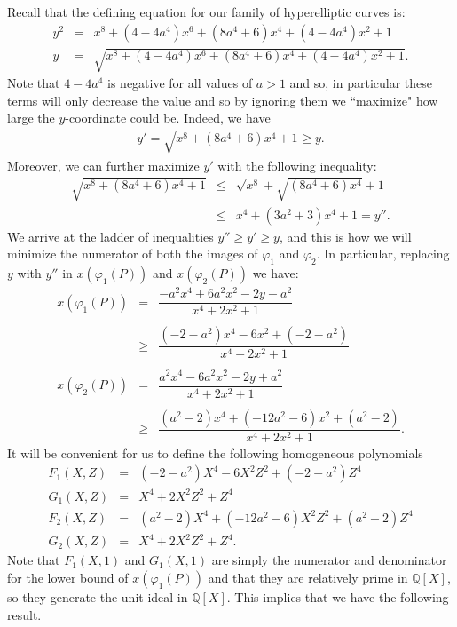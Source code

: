 \documentclass{article}
\newcommand{\Q}{\mathbb{Q}}
\theoremstyle{definition}
\begin{document}
\noindent Recall that the defining equation for our family of hyperelliptic curves is:
\begin{eqnarray*}
    y^2 &=& x^8 + (4-4a^4) x^6 + (8a^4 + 6) x^4 + (4-4a^4) x^2 + 1 \\
    y &=& \sqrt{x^8 + (4-4a^4) x^6 + (8a^4 + 6) x^4 + (4-4a^4) x^2 + 1}.
\end{eqnarray*}
Note that $4-4a^4$ is negative for all values of $a > 1$ and so, in particular these terms will only decrease the value and so by ignoring them we ``maximize" how large the $y$-coordinate could be. Indeed, we have 
\begin{eqnarray*}
    y' = \sqrt{x^8 + (8a^4 + 6) x^4 + 1} \geq y.
\end{eqnarray*}
Moreover, we can further maximize $y'$ with the following inequality:
\begin{eqnarray*}
    \sqrt{x^8 + (8a^4 + 6) x^4 + 1} &\leq& \sqrt{x^8} + \sqrt{(8a^4 + 6)x^4} + 1 \\
    &\leq& x^4 + (3a^2 + 3)x^4 + 1 = y''.
\end{eqnarray*}
We arrive at the ladder of inequalities $y'' \geq y' \geq y$, and this is how we will minimize the numerator of both the images of $\varphi_1$ and $\varphi_2$. In particular, replacing $y$ with $y''$ in $x(\varphi_1(P))$ and $x(\varphi_2(P))$ we have:
\begin{eqnarray*}
    x(\varphi_1(P)) &=& \dfrac{-a^2 x^4 + 6a^2 x^2 - 2y - a^2}{x^4 + 2x^2 + 1} \\\\
    &\geq& \dfrac{(-2-a^2)x^4 - 6x^2 + (-2-a^2)}{x^4 + 2x^2 + 1} \\\\
    x(\varphi_2(P)) &=& \dfrac{a^2 x^4 - 6a^2 x^2 - 2y + a^2}{x^4 + 2x^2 + 1} \\\\
    &\geq& \dfrac{(a^2-2)x^4 + (-12a^2 -6)x^2 + (a^2 - 2)}{x^4 + 2x^2 + 1}.
\end{eqnarray*}
It will be convenient for us to define the following homogeneous polynomials
\begin{eqnarray*}
    F_1(X,Z) &=& (-2-a^2)X^4 - 6X^2Z^2 + (-2-a^2)Z^4 \\
    G_1(X,Z) &=& X^4 + 2X^2Z^2 + Z^4 \\
    F_2(X,Z) &=& (a^2 - 2)X^4 + (-12a^2 - 6)X^2Z^2 + (a^2 - 2)Z^4 \\
    G_2(X,Z) &=& X^4 + 2X^2Z^2 + Z^4.
\end{eqnarray*}
Note that $F_1(X,1)$ and $G_1(X,1)$ are simply the numerator and denominator for the lower bound of $x(\varphi_1(P))$ and that they are relatively prime in $\Q[X]$, so they generate the unit ideal in $\Q[X]$. This implies that we have the following result.
\end{document}
